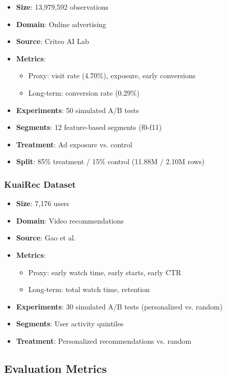 \documentclass[11pt,twocolumn]{article}
\begin{document}
\begin{itemize}
    \item \textbf{Size}: 13,979,592 observations
    \item \textbf{Domain}: Online advertising
    \item \textbf{Source}: Criteo AI Lab \cite{criteo2021uplift}
    \item \textbf{Metrics}:
    \begin{itemize}
        \item Proxy: visit rate (4.70\%), exposure, early conversions
        \item Long-term: conversion rate (0.29\%)
    \end{itemize}
    \item \textbf{Experiments}: 50 simulated A/B tests
    \item \textbf{Segments}: 12 feature-based segments (f0-f11)
    \item \textbf{Treatment}: Ad exposure vs. control
    \item \textbf{Split}: 85\% treatment / 15\% control (11.88M / 2.10M rows)
\end{itemize}

\subsubsection{KuaiRec Dataset}

\begin{itemize}
    \item \textbf{Size}: 7,176 users
    \item \textbf{Domain}: Video recommendations
    \item \textbf{Source}: Gao et al. \cite{gao2022kuairec}
    \item \textbf{Metrics}:
    \begin{itemize}
        \item Proxy: early watch time, early starts, early CTR
        \item Long-term: total watch time, retention
    \end{itemize}
    \item \textbf{Experiments}: 30 simulated A/B tests (personalized vs. random)
    \item \textbf{Segments}: User activity quintiles
    \item \textbf{Treatment}: Personalized recommendations vs. random
\end{itemize}

\subsection{Evaluation Metrics}
\end{document}
